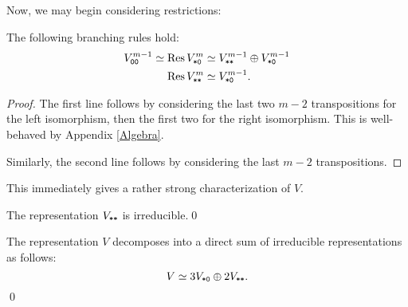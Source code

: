 \documentclass{amsart}
\begin{document}
Now, we may begin considering restrictions:
\begin{lemma}
  The following branching rules hold:
  \begin{align*}
    V^{m-1}_{\texttt{0}\texttt{0}} \simeq \operatorname{Res} V_{\texttt{*}\texttt{0}}^m &\simeq V^{m-1}_{\texttt{*}\texttt{*}} \oplus V^{m-1}_{\texttt{*}\texttt{0}}\\
    \operatorname{Res} V_{\texttt{*}\texttt{*}}^m &\simeq V_{\texttt{*}\texttt{0}}^{m-1}.
  \end{align*}
\end{lemma}
\begin{proof}
  The first line follows by considering the last two $m-2$ transpositions for the left isomorphism, then the first two for the right isomorphism.
  This is well-behaved by Appendix \ref{Algebra}.
  
  Similarly, the second line follows by considering the last $m-2$ transpositions.
\end{proof}
This immediately gives a rather strong characterization of $V$.
\begin{corollary}
  The representation $V_{\texttt{*}\texttt{*}}$ is irreducible.\qed
\end{corollary}
\begin{corollary}
  The representation $V$ decomposes into a direct sum of irreducible representations as follows:
  \[
    V \simeq 3V_{\texttt{*}\texttt{0}} \oplus 2V_{\texttt{*}\texttt{*}}.
  \]\qed
\end{corollary}
\end{document}
